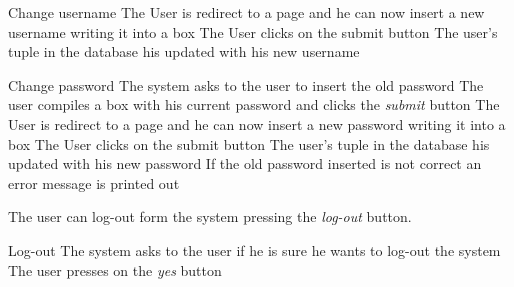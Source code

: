 \documentclass[a4paper]{article}
\begin{document}
       \begin{usecase}{Change username}
              {The User is redirect to a page and he can now insert a new username writing it into a box}
              {The User clicks on the submit button}
              {The user's tuple in the database his updated with his new username}
       \end{usecase}
       
       
       \begin{usecase}{Change password}
              {The system asks to the user to insert the old password}
              {The user compiles a box with his current password and clicks the \textit{submit} button}
              {The User is redirect to a page and he can now insert a new password writing it into a box}
              {The User clicks on the submit button}
              {The user's tuple in the database his updated with his new password}
        {If the old password inserted is not correct an error message is printed out}
       \end{usecase}
       
       
       The user can log-out form the system pressing the \textit{log-out} button.
       
       \begin{usecase}{Log-out}
              {The system asks to the user if he is sure he wants to log-out the system}
              {The user presses on the \textit{yes} button}
        \end{usecase}
       
\end{document}

